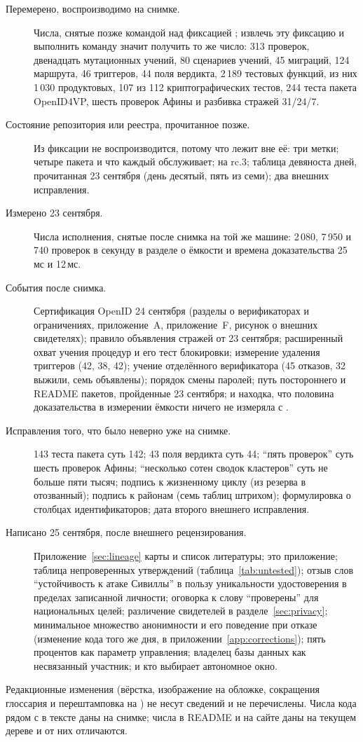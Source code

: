 \begin{description}
  \item[Перемерено, воспроизводимо на снимке.] Числа, снятые позже командой над фиксацией
    ; извлечь эту фиксацию и выполнить команду значит получить то же число: 313
    проверок, двенадцать мутационных учений, 80 сценариев учений, 45 миграций, 124 маршрута, 46
    триггеров, 44 поля вердикта, 2\,189 тестовых функций, из них 1\,030 продуктовых, 107 из 112
    криптографических тестов, 244 теста пакета OpenID4VP, шесть проверок Афины и разбивка стражей
    31/24/7.
  \item[Состояние репозитория или реестра, прочитанное позже.] Из фиксации не воспроизводится,
    потому что лежит вне её: три метки; четыре пакета и что каждый обслуживает;
     на rc.3; таблица девяноста дней, прочитанная 23 сентября (день десятый,
    пять из семи); два внешних исправления.
  \item[Измерено 23 сентября.] Числа исполнения, снятые после снимка на той же машине: 2\,080,
    7\,950 и 740 проверок в секунду в разделе о ёмкости и времена доказательства 25\,мс и 12\,мс.
  \item[События после снимка.] Сертификация OpenID 24 сентября (разделы о верификаторах и
    ограничениях, приложение~A, приложение~F, рисунок о внешних свидетелях); правило объявления
    стражей от 23 сентября; расширенный охват учения процедур и его тест блокировки; измерение
    удаления триггеров (42, 38, 42); учение отделённого верификатора (45 отказов, 32 выжили, семь
    объявлены); порядок смены паролей; путь постороннего и README пакетов, пройденные 23 сентября;
    и находка, что половина доказательства в измерении ёмкости ничего не измеряла с
    .
  \item[Исправления того, что было неверно уже на снимке.] 143 теста пакета суть 142; 43 поля
    вердикта суть 44; ``пять проверок'' суть шесть проверок Афины; ``несколько сотен сводок
    кластеров'' суть не больше пяти тысяч; подпись к жизненному циклу (из резерва в отозванный);
    подпись к районам (семь таблиц штрихом); формулировка о столбцах идентификаторов; дата второго
    внешнего исправления.
  \item[Написано 25 сентября, после внешнего рецензирования.] Приложение~\ref{sec:lineage} карты и список
    литературы; это приложение; таблица непроверенных утверждений (таблица~\ref{tab:untested});
    отзыв слов ``устойчивость к атаке Сивиллы'' в пользу уникальности удостоверения в пределах
    записанной личности; оговорка к слову ``проверены'' для национальных целей; различение
    свидетелей в разделе~\ref{sec:privacy}; минимальное множество анонимности и его поведение при
    отказе (изменение кода того же дня, в приложении~\ref{app:corrections}); пять процентов как параметр управления;
    владелец базы данных как несвязанный участник; и кто выбирает автономное окно.
\end{description}

Редакционные изменения (вёрстка, изображение на обложке, сокращения глоссария и перештамповка
 на ) не несут сведений и не перечислены. Числа кода рядом с  в
тексте даны на снимке; числа в README и на сайте даны на текущем дереве и от них отличаются.

